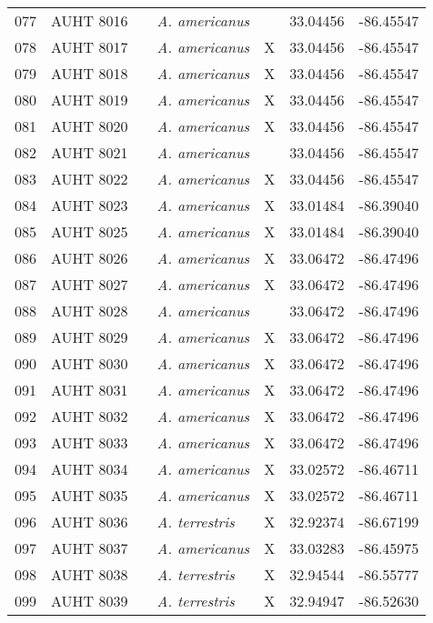 \begin{longtable}{ lllllll }
077 & AUHT 8016 &  & \textit{A. americanus} &  & 33.04456 & -86.45547 \\ 
078 & AUHT 8017 &  & \textit{A. americanus} & X & 33.04456 & -86.45547 \\ 
079 & AUHT 8018 &  & \textit{A. americanus} & X & 33.04456 & -86.45547 \\ 
080 & AUHT 8019 &  & \textit{A. americanus} & X & 33.04456 & -86.45547 \\ 
081 & AUHT 8020 &  & \textit{A. americanus} & X & 33.04456 & -86.45547 \\ 
082 & AUHT 8021 &  & \textit{A. americanus} &  & 33.04456 & -86.45547 \\ 
083 & AUHT 8022 &  & \textit{A. americanus} & X & 33.04456 & -86.45547 \\ 
084 & AUHT 8023 &  & \textit{A. americanus} & X & 33.01484 & -86.39040 \\ 
085 & AUHT 8025 &  & \textit{A. americanus} & X & 33.01484 & -86.39040 \\ 
086 & AUHT 8026 &  & \textit{A. americanus} & X & 33.06472 & -86.47496 \\ 
087 & AUHT 8027 &  & \textit{A. americanus} & X & 33.06472 & -86.47496 \\ 
088 & AUHT 8028 &  & \textit{A. americanus} &  & 33.06472 & -86.47496 \\ 
089 & AUHT 8029 &  & \textit{A. americanus} & X & 33.06472 & -86.47496 \\ 
090 & AUHT 8030 &  & \textit{A. americanus} & X & 33.06472 & -86.47496 \\ 
091 & AUHT 8031 &  & \textit{A. americanus} & X & 33.06472 & -86.47496 \\ 
092 & AUHT 8032 &  & \textit{A. americanus} & X & 33.06472 & -86.47496 \\ 
093 & AUHT 8033 &  & \textit{A. americanus} & X & 33.06472 & -86.47496 \\ 
094 & AUHT 8034 &  & \textit{A. americanus} & X & 33.02572 & -86.46711 \\ 
095 & AUHT 8035 &  & \textit{A. americanus} & X & 33.02572 & -86.46711 \\ 
096 & AUHT 8036 &  & \textit{A. terrestris} & X & 32.92374 & -86.67199 \\ 
097 & AUHT 8037 &  & \textit{A. americanus} & X & 33.03283 & -86.45975 \\ 
098 & AUHT 8038 &  & \textit{A. terrestris} & X & 32.94544 & -86.55777 \\ 
099 & AUHT 8039 &  & \textit{A. terrestris} & X & 32.94947 & -86.52630 \\ 

\end{longtable}
